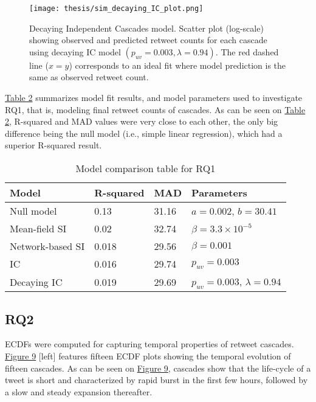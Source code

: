 \documentclass[11pt,a4paper]{article}
\begin{document}
    \begin{figure}[H]
        \hypertarget{fig:dec-IC}{}
        \centering
        \texttt{[image: thesis/sim\_decaying\_IC\_plot.png]}\\
        \caption{Decaying Independent Cascades model. Scatter plot (log-scale) showing observed and predicted retweet counts for each cascade using decaying IC model $(p_{uv} = 0.003, \lambda = 0.94)$. The red dashed line ($x=y$) corresponds to an ideal fit where model prediction is the same as observed retweet count.}    
        \label{fig:enter-label}
    \end{figure}

    \hyperlink{tab:comp}{Table 2} summarizes model fit results, and model parameters used to investigate RQ1, that is, modeling final retweet counts of cascades. As can be seen on \hyperlink{tab:comp}{Table 2}, R-squared and MAD values were very close to each other, the only big difference being the null model (i.e., simple linear regression), which had a superior R-squared result.

    \begin{table}[H]
        \hypertarget{tab:comp}{}
      \centering
      \begin{tabular}{|l|l|l|l|}
        \hline
        \textbf{Model} & \textbf{R-squared} & \textbf{MAD}  & \textbf{Parameters} \\
        \hline
        Null model    & 0.13 & 31.16 & $a = 0.002$, $b = 30.41$  \\
        Mean-field SI & 0.02 & 32.74 & $\beta = 3.3 \times 10^{-5}$ \\
        Network-based SI & 0.018 & 29.56 & $\beta=0.001$ \\
        IC               & 0.016 & 29.74 & $p_{uv} = 0.003$  \\
        Decaying IC      & 0.019 & 29.69 & $p_{uv} = 0.003$, $\lambda = 0.94 $ \\
        \hline
      \end{tabular}
      \caption{Model comparison table for RQ1}
      \label{tab:mytable}
    \end{table}

    \subsection{RQ2}
    ECDFs were computed for capturing temporal properties of retweet cascades. \hyperlink{fig:ecdf-vs-iter}{Figure 9} [left] features fifteen ECDF plots showing the temporal evolution of fifteen cascades. As can be seen on \hyperlink{fig:ecdf-vs-iter}{Figure 9}, cascades show that the life-cycle of a tweet is short and characterized by rapid burst in the first few hours, followed by a slow and steady expansion thereafter.
    
\end{document}
